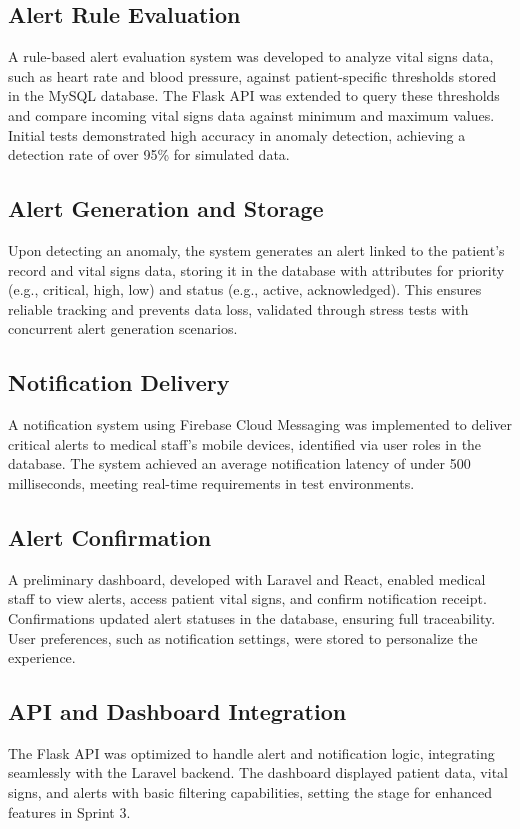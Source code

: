 \subsection{Alert Rule Evaluation}
A rule-based alert evaluation system was developed to analyze vital signs data, such as heart rate and blood pressure, against patient-specific thresholds stored in the MySQL database. The Flask API was extended to query these thresholds and compare incoming vital signs data against minimum and maximum values. Initial tests demonstrated high accuracy in anomaly detection, achieving a detection rate of over 95\% for simulated data.

\subsection{Alert Generation and Storage}
Upon detecting an anomaly, the system generates an alert linked to the patient’s record and vital signs data, storing it in the database with attributes for priority (e.g., critical, high, low) and status (e.g., active, acknowledged). This ensures reliable tracking and prevents data loss, validated through stress tests with concurrent alert generation scenarios.

\subsection{Notification Delivery}
A notification system using Firebase Cloud Messaging was implemented to deliver critical alerts to medical staff’s mobile devices, identified via user roles in the database. The system achieved an average notification latency of under 500 milliseconds, meeting real-time requirements in test environments.

\subsection{Alert Confirmation}
A preliminary dashboard, developed with Laravel and React, enabled medical staff to view alerts, access patient vital signs, and confirm notification receipt. Confirmations updated alert statuses in the database, ensuring full traceability. User preferences, such as notification settings, were stored to personalize the experience.

\subsection{API and Dashboard Integration}
The Flask API was optimized to handle alert and notification logic, integrating seamlessly with the Laravel backend. The dashboard displayed patient data, vital signs, and alerts with basic filtering capabilities, setting the stage for enhanced features in Sprint 3.

